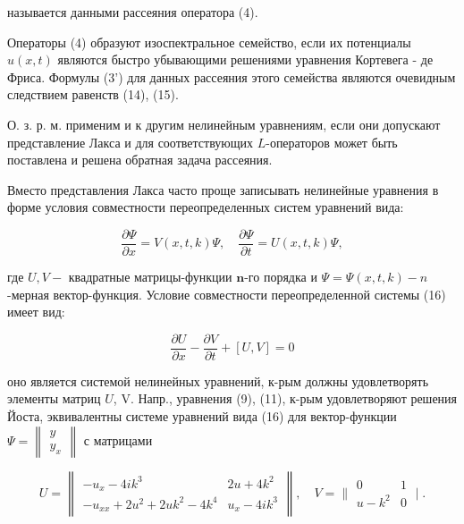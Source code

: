 \documentclass[10pt]{article}
\begin{document}
называется данными рассеяния оператора (4).



Операторы (4) образуют изоспектральное семейство, если их потенциалы $u(x, t)$ являются быстро убывающими решениями уравнения Кортевега - де Фриса. Формулы (3') для данных рассеяния этого семейства являются очевидным следствием равенств (14), (15).



О. з. р. м. применим и к другим нелинейным уравнениям, если они допускают представление Лакса и для соответствующих $L$-операторов может быть поставлена и решена обратная задача рассеяния.



Вместо представления Лакса часто проще записывать нелинейные уравнения в форме условия совместности переопределенных систем уравнений вида:



\[

\frac{\partial \Psi}{\partial x}=V(x, t, k) \Psi, \quad \frac{\partial \Psi}{\partial t}=U(x, t, k) \Psi,

\]



где $U, V-$ квадратные матрицы-функции $\boldsymbol{n}$-го порядка и $\Psi=\Psi(x, t, k)-n$-мерная вектор-функция. Условие совместности переопределенной системы (16) имеет вид:



\[

\frac{\partial U}{\partial x}-\frac{\partial V}{\partial t}+[U, V]=0

\]



оно является системой нелинейных уравнений, к-рым должны удовлетворять элементы матриц $U$, V. Напр., уравнения (9), (11), к-рым удовлетворяют решения Йоста, эквивалентны системе уравнений вида (16) для вектор-функции $\Psi=\left\|\begin{array}{l}y \\ y_{x}\end{array}\right\|$ с матрицами



\[

U=\left\|\begin{array}{ll}

-u_{x}-4 i k^{3} & 2 u+4 k^{2} \\

-u_{x x}+2 u^{2}+2 u k^{2}-4 k^{4} & u_{x}-4 i k^{3}

\end{array}\right\|, \quad V=\| \begin{array}{ll}

0 & 1 \\

u-k^{2} & 0

\end{array} \mid .

\]
\end{document}
